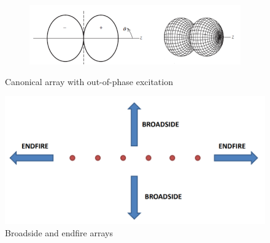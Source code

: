 \documentclass[11pt,a4paper]{article}
\begin{document}
\begin{enumerate}
\begin{figure}[!ht]
\begin{subfigure}{.45\textwidth}
        \end{subfigure}\hfill
        \begin{subfigure}{.45\textwidth}
            \centering
            \includegraphics[width=\textwidth]{src/canonical-array-out-of-phase-pattern.png}
        \end{subfigure}
        \caption{\label{fig:canonical-array-out-of-phase}Canonical array with out-of-phase excitation}
    \end{figure}
    \begin{figure}[!ht]
        \centering
        \includegraphics[width=.5\textwidth]{src/broadside-endfire.png}
        \caption{\label{fig:broadside-endfire}Broadside and endfire arrays}
    \end{figure}


\end{enumerate}
\end{document}
